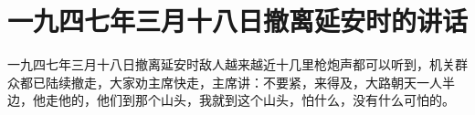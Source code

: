 \section[一九四七年三月十八日撤离延安时的讲话（一九四七年三月十八日）]{一九四七年三月十八日撤离延安时的讲话}


一九四七年三月十八日撤离延安时敌人越来越近十几里枪炮声都可以听到，机关群众都已陆续撤走，大家劝主席快走，主席讲：不要紧，来得及，大路朝天一人半边，他走他的，他们到那个山头，我就到这个山头，怕什么，没有什么可怕的。

